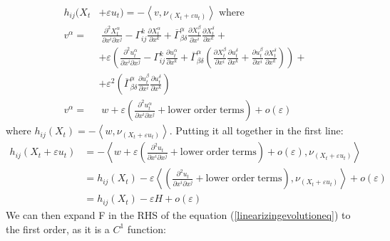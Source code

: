 \begin{align*}
	h_{ij}(X_t& + \varepsilon u_t )=-\left\langle v, \nu_{(X_t+\varepsilon u_t)}\right\rangle\; \mathrm{where}\\
	v^\alpha=&\; \frac{\partial^2 X_t^\alpha}{\partial x^i \partial x^j} - \Gamma^k_{ij}\frac{\partial X_t^\alpha}{\partial x^k}+\overline{\Gamma}^\alpha_{\beta \delta}\frac{\partial X_t^\beta}{\partial x^i}\frac{\partial X_t^\delta}{\partial x^k} +\\ %
	&+\varepsilon\left(\frac{\partial^2 u_t^\alpha}{\partial x^i \partial x^j} - \Gamma^k_{ij}\frac{\partial u_t^\alpha}{\partial x^k}+\overline{\Gamma}^\alpha_{\beta \delta}\left(\frac{\partial X_t^\beta}{\partial x^i}\frac{\partial u_t^\delta}{\partial x^k} + \frac{\partial u_t^\beta}{\partial x^i}\frac{\partial X_t^\delta}{\partial x^k}\right)\right)+\\
	&+\varepsilon^2\left(\overline{\Gamma}^\alpha_{\beta \delta}\frac{\partial u_t^\beta}{\partial x^i}\frac{\partial u_t^\delta}{\partial x^k}\right) \\
	v^\alpha=&\; w +\varepsilon\left(\frac{\partial^2 u_t^\alpha}{\partial x^i \partial x^j} + \mathrm{lower \; order \;  terms}\right) + o(\varepsilon)
\end{align*}
where $h_{ij}(X_t)=-\left\langle w, \nu_{(X_t+\varepsilon u_t)}\right\rangle$. Putting it all together in the first line:
\begin{align*}
	h_{ij}(X_t + \varepsilon u_t ) &=-\left\langle  w +\varepsilon\left(\frac{\partial^2 u_t}{\partial x^i \partial x^j} + \mathrm{lower \; order \;  terms}\right) + o(\varepsilon), \nu_{(X_t+\varepsilon u_t)}\right\rangle\\
	&= h_{ij}(X_t) -\varepsilon\left\langle  \left(\frac{\partial^2 u_t}{\partial x^i \partial x^j} + \mathrm{lower \; order \;  terms}\right), \nu_{(X_t+\varepsilon u_t)}\right\rangle + o(\varepsilon)\\
	&= h_{ij}(X_t) -\varepsilon H + o(\varepsilon)
\end{align*}
We can then expand F in the RHS of the equation (\ref{linearizingevolutioneq}) to the first order, as it is a $C^1$ function: 

